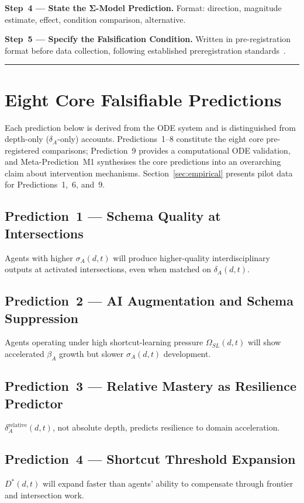 \documentclass[10pt]{article}
\begin{document}
\textbf{Step~4 --- State the Σ-Model Prediction.} Format: direction,
magnitude estimate, effect, condition comparison, alternative.

\textbf{Step~5 --- Specify the Falsification Condition.} Written in
pre-registration format before data collection, following established preregistration standards~\citep{pineau2021reproducibility}.

\noindent\rule{\linewidth}{0.4pt}

\section{Eight Core Falsifiable Predictions}\label{sec:predictions}

Each prediction below is derived from the ODE system and is distinguished from depth-only ($\delta_A$-only) accounts. Predictions~1--8 constitute the eight core pre-registered comparisons; Prediction~9 provides a computational ODE validation, and Meta-Prediction~M1 synthesises the core predictions into an overarching claim about intervention mechanisms. Section~\ref{sec:empirical} presents pilot data for Predictions~1,~6, and~9.

\subsection{Prediction~1 --- Schema Quality at Intersections}
Agents with higher $\sigma_A(d,t)$ will produce higher-quality
interdisciplinary outputs at activated intersections, even when matched
on $\delta_A(d,t)$.

\subsection{Prediction~2 --- AI Augmentation and Schema Suppression}
Agents operating under high shortcut-learning pressure $\Omega_{SL}(d,t)$ will show accelerated $\beta_A$
growth but slower $\sigma_A(d,t)$ development.

\subsection{Prediction~3 --- Relative Mastery as Resilience Predictor}
$\delta_A^{\text{relative}}(d,t)$, not absolute depth, predicts
resilience to domain acceleration.

\subsection{Prediction~4 --- Shortcut Threshold Expansion}
$D^*(d,t)$ will expand faster than agents' ability to compensate through
frontier and intersection work.
\end{document}
